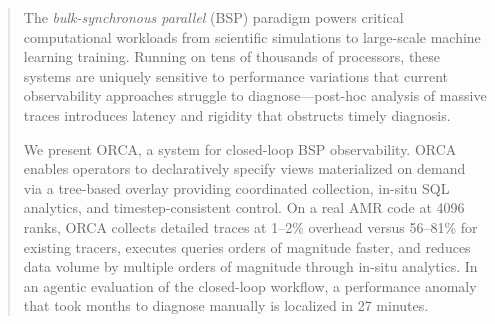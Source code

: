 \begin{abstract}
  The \emph{bulk-synchronous parallel} (BSP) paradigm powers critical computational workloads from
  scientific simulations to large-scale machine learning training.
  Running on tens of thousands of processors, these systems are uniquely sensitive to performance
  variations that current observability approaches struggle to diagnose---post-hoc analysis of massive
  traces introduces latency and rigidity that obstructs timely diagnosis.

  We present ORCA, a system for closed-loop BSP observability.
  ORCA enables operators to declaratively specify views materialized on demand via a tree-based
  overlay providing coordinated collection, in-situ SQL analytics, and timestep-consistent control.
  On a real AMR code at 4096 ranks, ORCA collects detailed traces at 1--2\% overhead versus 56--81\%
  for existing tracers, executes queries orders of magnitude faster, and reduces data volume by
  multiple orders of magnitude through in-situ analytics.
  In an agentic evaluation of the closed-loop workflow, a performance anomaly that took months to
  diagnose manually is localized in 27 minutes.
\end{abstract}
